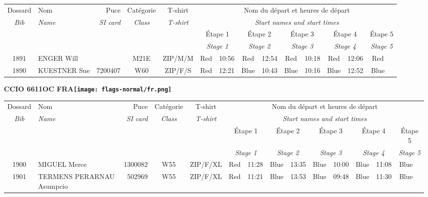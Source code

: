 \documentclass{report}
\begin{document}
  \begin{longtable}{|c|l|r|c|c|*{5}{cc|}}
    Dossard & Nom  & Puce    & Catégorie & T-shirt & \multicolumn{10}{c|}{Nom du départ et heures de départ} \\
    \itshape Bib     & \itshape Name & \itshape SI card & \itshape Class  & \itshape  T-shirt  & \multicolumn{10}{c|}{\itshape Start names and start times} \\
    \hline
    & & & & & \multicolumn{2}{c|}{Étape 1} & \multicolumn{2}{c|}{Étape 2} & \multicolumn{2}{c|}{Étape 3} & \multicolumn{2}{c|}{Étape 4} & \multicolumn{2}{c|}{Étape 5} \\
    & & & & & \multicolumn{2}{c|}{\itshape Stage 1} & \multicolumn{2}{c|}{\itshape Stage 2} & \multicolumn{2}{c|}{\itshape Stage 3} & \multicolumn{2}{c|}{\itshape Stage 4} & \multicolumn{2}{c|}{\itshape Stage 5} \\
    \hline
    1891 & ENGER Will &  & M21E & ZIP/M/M & Red & 10:56 & Red & 12:54 & Red & 10:18 & Red & 12:06 & Red &  \\
    1890 & KUESTNER Sue & 7200407 & W60 & ZIP/F/S & Red & 12:21 & Blue & 10:43 & Blue & 10:16 & Blue & 12:52 & Blue &  \\
  \end{longtable}
\newpage
  \Huge \centering \bfseries CCIO 6611OC FRA\normalfont \footnotesize \sffamily \hfill \texttt{[image: flags-normal/fr.png]} \newline 
  \begin{longtable}{|c|l|r|c|c|*{5}{cc|}}
    Dossard & Nom  & Puce    & Catégorie & T-shirt & \multicolumn{10}{c|}{Nom du départ et heures de départ} \\
    \itshape Bib     & \itshape Name & \itshape SI card & \itshape Class  & \itshape  T-shirt  & \multicolumn{10}{c|}{\itshape Start names and start times} \\
    \hline
    & & & & & \multicolumn{2}{c|}{Étape 1} & \multicolumn{2}{c|}{Étape 2} & \multicolumn{2}{c|}{Étape 3} & \multicolumn{2}{c|}{Étape 4} & \multicolumn{2}{c|}{Étape 5} \\
    & & & & & \multicolumn{2}{c|}{\itshape Stage 1} & \multicolumn{2}{c|}{\itshape Stage 2} & \multicolumn{2}{c|}{\itshape Stage 3} & \multicolumn{2}{c|}{\itshape Stage 4} & \multicolumn{2}{c|}{\itshape Stage 5} \\
    \hline
    1900 & MIGUEL Merce & 1300082 & W55 & ZIP/F/XL & Red & 11:28 & Blue & 13:35 & Blue & 10:00 & Blue & 11:08 & Blue &  \\
    1901 & TERMENS PERARNAU Asumpcio & 502969 & W55 & ZIP/F/XL & Red & 11:21 & Blue & 13:53 & Blue & 09:48 & Blue & 11:30 & Blue &  \\
  \end{longtable}
\end{document}
